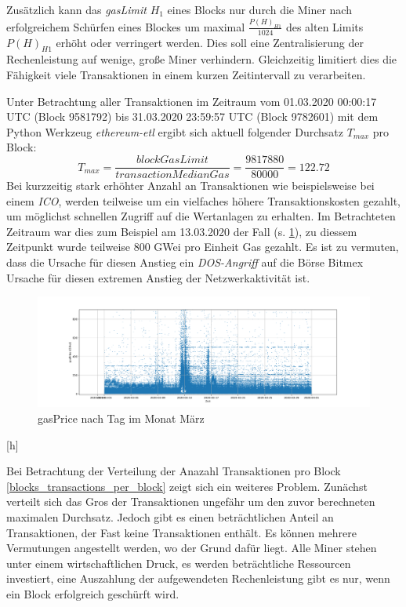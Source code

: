 \documentclass[runningheads]{llncs}
\begin{document}
Zusätzlich kann das \textit{gasLimit} $ H_1 $ eines Blocks nur durch die Miner nach erfolgreichem Schürfen eines Blockes um maximal $ \frac{P(H)_{H1}}{1024} $ des alten Limits  $ P(H)_{H1} $ erhöht oder verringert werden. Dies soll eine Zentralisierung der Rechenleistung auf wenige, große Miner verhindern. Gleichzeitig limitiert dies die Fähigkeit viele Transaktionen in einem kurzen Zeitintervall zu verarbeiten.

Unter Betrachtung aller Transaktionen im Zeitraum vom 01.03.2020 00:00:17 UTC (Block 9581792) bis 31.03.2020 23:59:57 UTC (Block 9782601) mit dem Python Werkzeug \textit{ethereum-etl} \cite{noauthor_blockchain-etl/ethereum-etl_2020} ergibt sich aktuell folgender Durchsatz $ T_{max} $ pro Block: \cite{neemann_appendix_nodate}
$$
  T_{max} = \frac{\textit{blockGasLimit}}{\textit{transactionMedianGas}} = \frac{9817880}{80000} = 122.72
$$
Bei kurzzeitig stark erhöhter Anzahl an Transaktionen wie beispielsweise bei einem \textit{ICO}, werden teilweise um ein vielfaches höhere Transaktionskosten gezahlt, um möglichst schnellen Zugriff auf die Wertanlagen zu erhalten. \cite[S. 9:6 f.]{m.spain_oasics-tokeneconomics_2019} Im Betrachteten Zeitraum war dies zum Beispiel am 13.03.2020 der Fall (s. \ref{transactions_gasprice_timeseries}), zu diessem Zeitpunkt wurde teilweise 800 GWei pro Einheit Gas gezahlt. Es ist zu vermuten, dass die Ursache für diesen Anstieg ein \textit{DOS-Angriff} auf die Börse Bitmex Ursache für diesen extremen Anstieg der Netzwerkaktivität ist. \cite{bitmex_ddos_nodate}
\begin{figure}
  \includegraphics[width=\textwidth, keepaspectratio]{transactions_gasprice_timeseries.png}
  \caption{gasPrice nach Tag im Monat März \cite{neemann_appendix_nodate}}
  \label{transactions_gasprice_timeseries}
\end{figure}[h]

Bei Betrachtung der Verteilung der Anazahl Transaktionen pro Block \ref{blocks_transactions_per_block} zeigt sich ein weiteres Problem. Zunächst verteilt sich das Gros der Transaktionen ungefähr um den zuvor berechneten maximalen Durchsatz. Jedoch gibt es einen beträchtlichen Anteil an Transaktionen, der Fast keine Transaktionen enthält. Es können mehrere Vermutungen angestellt werden, wo der Grund dafür liegt. Alle Miner stehen unter einem wirtschaftlichen Druck, es werden beträchtliche Ressourcen investiert, eine Auszahlung der aufgewendeten Rechenleistung gibt es nur, wenn ein Block erfolgreich geschürft wird. \cite{research_empty_nodate}
\end{document}
